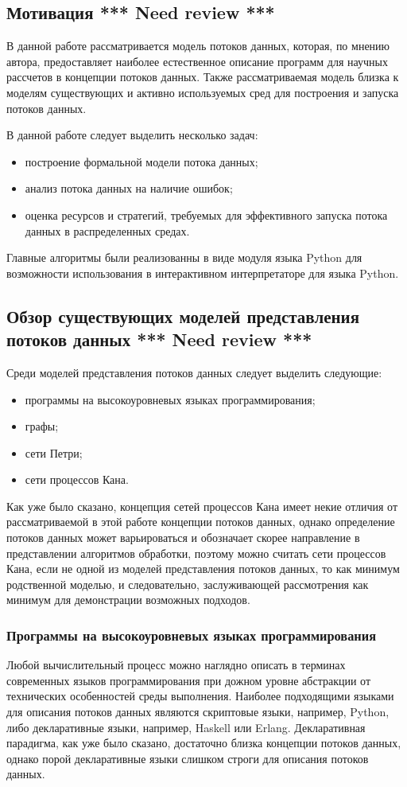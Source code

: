 \documentclass[10pt,a4paper]{article}
\begin{document}
\subsection{Мотивация \textbf{*** Need review ***}}
В данной работе рассматривается модель потоков данных, которая, по мнению автора, предоставляет наиболее
естественное описание программ для научных рассчетов в концепции потоков данных.
Также рассматриваемая модель близка к моделям существующих и активно используемых сред для построения и запуска потоков данных.

В данной работе следует выделить несколько задач:
\begin{itemize}
  \item построение формальной модели потока данных;
  \item анализ потока данных на наличие ошибок;
  \item оценка ресурсов и стратегий, требуемых для эффективного запуска потока данных в распределенных средах.
\end{itemize}

Главные алгоритмы были реализованны в виде модуля языка Python для возможности
использования в интерактивном интерпретаторе для языка Python.

\subsection{Обзор существующих моделей представления потоков данных \textbf{*** Need review ***}}
Среди моделей представления потоков данных следует выделить следующие:
\begin{itemize}
  \item программы на высокоуровневых языках программирования;
  \item графы;
  \item сети Петри;
  \item сети процессов Кана.
\end{itemize}

Как уже было сказано, концепция сетей процессов Кана имеет некие отличия от рассматриваемой в этой работе концепции потоков данных,
однако определение потоков данных может варьироваться и обозначает скорее направление в представлении алгоритмов обработки,
поэтому можно считать сети процессов Кана, если не одной из моделей представления потоков данных, то как минимум родственной моделью,
и следовательно, заслуживающей рассмотрения как минимум для демонстрации возможных подходов.

\subsubsection{Программы на высокоуровневых языках программирования}
Любой вычислительный процесс можно наглядно описать в терминах современных языков программирования при дожном уровне абстракции от технических особенностей среды выполнения.
Наиболее подходящими языками для описания потоков данных являются скриптовые языки, например, Python, либо декларативные языки, например, Haskell или Erlang.
Декларативная парадигма, как уже было сказано, достаточно близка концепции потоков данных, однако порой декларативные языки слишком строги для описания потоков данных.
\end{document}
